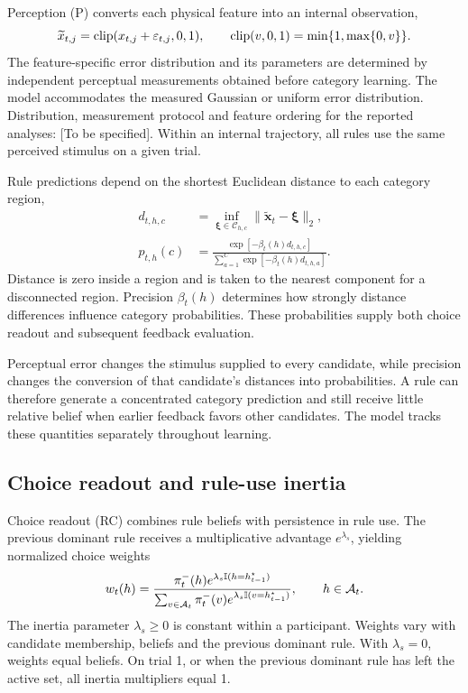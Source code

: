 Perception (P) converts each physical feature into an internal observation,
\begin{equation}
\widetilde x_{t,j}=\operatorname{clip}(x_{t,j}+\varepsilon_{t,j},0,1),\qquad
\operatorname{clip}(v,0,1)=\min\{1,\max\{0,v\}\}.
\label{eq:internal-stimulus}
\end{equation}
The feature-specific error distribution and its parameters are determined by independent perceptual measurements obtained before category learning. The model accommodates the measured Gaussian or uniform error distribution. Distribution, measurement protocol and feature ordering for the reported analyses: [To be specified]. Within an internal trajectory, all rules use the same perceived stimulus on a given trial.

Rule predictions depend on the shortest Euclidean distance to each category region,
\begin{align}
d_{t,h,c}&=\inf_{\bm\xi\in\mathcal C_{h,c}}
\|\widetilde{\bm x}_t-\bm\xi\|_2,\\
p_{t,h}(c)&=\frac{\exp[-\beta_t(h)d_{t,h,c}]}
{\sum_{a=1}^{C}\exp[-\beta_t(h)d_{t,h,a}]}.
\label{eq:category-prediction}
\end{align}
Distance is zero inside a region and is taken to the nearest component for a disconnected region. Precision $\beta_t(h)$ determines how strongly distance differences influence category probabilities. These probabilities supply both choice readout and subsequent feedback evaluation.

Perceptual error changes the stimulus supplied to every candidate, while precision changes the conversion of that candidate's distances into probabilities. A rule can therefore generate a concentrated category prediction and still receive little relative belief when earlier feedback favors other candidates. The model tracks these quantities separately throughout learning.

\subsection*{Choice readout and rule-use inertia}
\label{m:choice}

Choice readout (RC) combines rule beliefs with persistence in rule use. The previous dominant rule receives a multiplicative advantage $e^{\lambda_s}$, yielding normalized choice weights
\begin{equation}
w_t(h)=\frac{\pi_t^-(h)e^{\lambda_s\mathbb I(h=h_{t-1}^{\star})}}
{\sum_{v\in\mathcal A_t}\pi_t^-(v)e^{\lambda_s\mathbb I(v=h_{t-1}^{\star})}},
\qquad h\in\mathcal A_t.
\label{eq:choice-weights}
\end{equation}
The inertia parameter $\lambda_s\geq0$ is constant within a participant. Weights vary with candidate membership, beliefs and the previous dominant rule. With $\lambda_s=0$, weights equal beliefs. On trial 1, or when the previous dominant rule has left the active set, all inertia multipliers equal 1.

